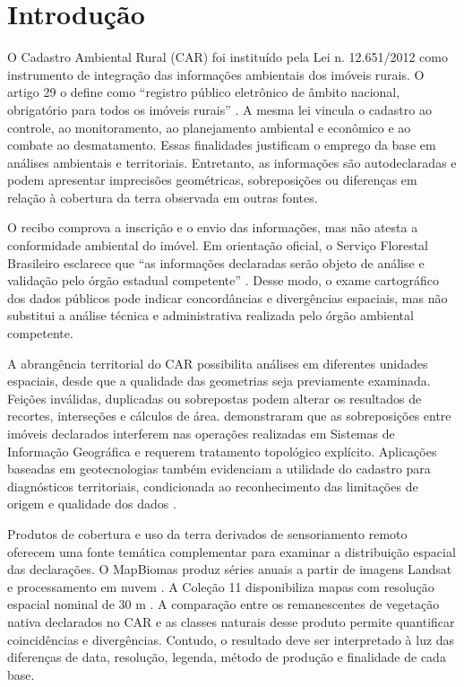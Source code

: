 
\section{Introdução}

O Cadastro Ambiental Rural (CAR) foi instituído pela Lei n. 12.651/2012 como instrumento de integração das informações ambientais dos imóveis rurais. O artigo 29 o define como ``registro público eletrônico de âmbito nacional, obrigatório para todos os imóveis rurais'' \cite[art. 29]{brasil2012}. A mesma lei vincula o cadastro ao controle, ao monitoramento, ao planejamento ambiental e econômico e ao combate ao desmatamento. Essas finalidades justificam o emprego da base em análises ambientais e territoriais. Entretanto, as informações são autodeclaradas e podem apresentar imprecisões geométricas, sobreposições ou diferenças em relação à cobertura da terra observada em outras fontes.

O recibo comprova a inscrição e o envio das informações, mas não atesta a conformidade ambiental do imóvel. Em orientação oficial, o Serviço Florestal Brasileiro esclarece que ``as informações declaradas serão objeto de análise e validação pelo órgão estadual competente'' \cite{car2026}. Desse modo, o exame cartográfico dos dados públicos pode indicar concordâncias e divergências espaciais, mas não substitui a análise técnica e administrativa realizada pelo órgão ambiental competente.

A abrangência territorial do CAR possibilita análises em diferentes unidades espaciais, desde que a qualidade das geometrias seja previamente examinada. Feições inválidas, duplicadas ou sobrepostas podem alterar os resultados de recortes, interseções e cálculos de área.  demonstraram que as sobreposições entre imóveis declarados interferem nas operações realizadas em Sistemas de Informação Geográfica e requerem tratamento topológico explícito. Aplicações baseadas em geotecnologias também evidenciam a utilidade do cadastro para diagnósticos territoriais, condicionada ao reconhecimento das limitações de origem e qualidade dos dados \cite{santos2021}.

Produtos de cobertura e uso da terra derivados de sensoriamento remoto oferecem uma fonte temática complementar para examinar a distribuição espacial das declarações. O MapBiomas produz séries anuais a partir de imagens Landsat e processamento em nuvem \cite{souza2020}. A Coleção 11 disponibiliza mapas com resolução espacial nominal de 30 m \cite{mapbiomas2026}. A comparação entre os remanescentes de vegetação nativa declarados no CAR e as classes naturais desse produto permite quantificar coincidências e divergências. Contudo, o resultado deve ser interpretado à luz das diferenças de data, resolução, legenda, método de produção e finalidade de cada base.

